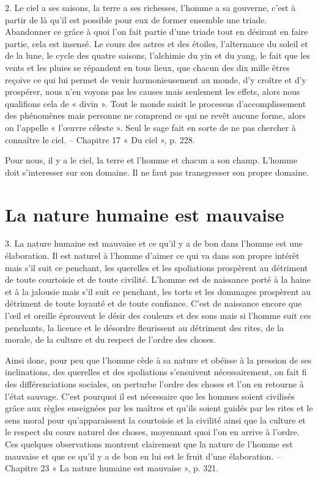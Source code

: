 \begin{singlequote}
    2.	Le ciel a ses saisons, la terre a ses richesses, l’homme a sa gouverne, c’est à partir de là qu’il est possible pour eux de former ensemble une triade. Abandonner ce grâce à quoi l’on fait partie d’une triade tout en désirant en faire partie, cela est insensé. Le cours des astres et des étoiles, l’alternance du soleil et de la lune, le cycle des quatre saisons, l’alchimie du yin et du yang, le fait que les vents et les pluies se répandent en tous lieux, que chacun des dix mille êtres reçoive ce qui lui permet de venir harmonieusement au monde, d’y croître et d’y prospérer, nous n’en voyons pas les causes mais seulement les effets, alors nous qualifions cela de « divin ». Tout le monde saisit le processus d’accomplissement des phénomènes mais personne ne comprend ce qui ne revêt aucune forme, alors on l’appelle « l’œuvre céleste ». Seul le sage fait en sorte de ne pas chercher à connaître le ciel.
-- Chapitre 17 « Du ciel », p. 228.
\end{singlequote}

Pour nous, il y a le ciel, la terre et l'homme et chacun a son champ. L'homme doit s'interesser sur son domaine.
Il ne faut pas transgresser son propre domaine.

\section{La nature humaine est mauvaise}
\begin{singlequote}
    3.	La nature humaine est mauvaise et ce qu’il y a de bon dans l’homme est une élaboration. Il est naturel à l’homme d’aimer ce qui va dans son propre intérêt mais s’il suit ce penchant,
les querelles et les spoliations prospèrent au détriment de toute courtoisie et de toute civilité. L’homme est de naissance porté à la haine et à la jalousie mais s’il suit ce penchant, les torts et les dommages prospèrent au détriment de toute loyauté et de toute confiance. C’est de naissance encore que l’œil et oreille éprouvent le désir des couleurs et des sons mais si l’homme suit ces penchants, la licence et le désordre fleurissent au détriment des rites, de la morale, de la culture et du respect de l’ordre des choses.
 
Ainsi donc, pour peu que l’homme cède à sa nature et obéisse à la pression de ses inclinations, des querelles et des spoliations s’ensuivent nécessairement, on fait fi des différenciations sociales, on perturbe l’ordre des choses et l’on en retourne à l’état sauvage. C’est pourquoi il est nécessaire que les hommes soient civilisés grâce aux règles enseignées par les maîtres et qu’ils soient guidés par les rites et le sens moral pour qu’apparaissent la courtoisie et la civilité ainsi que la culture et le respect du cours naturel des choses, moyennant quoi l’on en arrive à l’ordre. Ces quelques observations montrent clairement que la nature de l’homme est mauvaise et que ce qu’il y a de bon en lui est le fruit d’une élaboration.
-- Chapitre 23 « La nature humaine est mauvaise », p. 321.

\end{singlequote}


